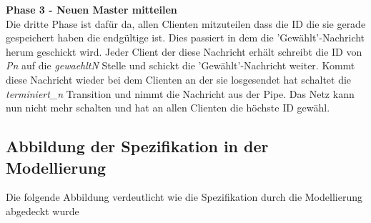\textbf{Phase 3 - Neuen Master mitteilen}\\
Die dritte Phase ist dafür da, allen Clienten mitzuteilen dass die ID die sie gerade gespeichert haben die endgültige ist. Dies passiert in dem die 'Gewählt'-Nachricht herum geschickt wird. Jeder Client der diese Nachricht erhält schreibt die ID von \textit{Pn} auf die \textit{gewaehltN} Stelle und schickt die 'Gewählt'-Nachricht weiter. Kommt diese Nachricht wieder bei dem Clienten an der sie losgesendet hat schaltet die \textit{terminiert\_n} Transition und nimmt die Nachricht aus der Pipe. Das Netz kann nun nicht mehr schalten und hat an allen Clienten die höchste ID gewähl.

\subsection{Abbildung der Spezifikation in der Modellierung} \label{Spezi-Modell}

Die folgende Abbildung verdeutlicht wie die Spezifikation durch die Modellierung abgedeckt wurde

